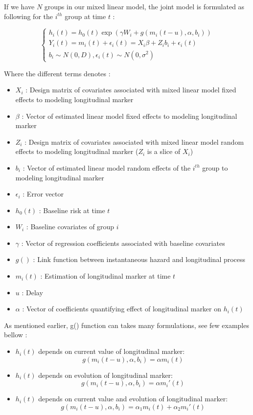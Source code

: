 \documentclass[11pt, oneside]{article}   	%
\providecommand{\tightlist}{%
      \setlength{\itemsep}{0pt}\setlength{\parskip}{0pt}}
\begin{document}
If we have \(N\) groups in our mixed linear model, the joint model is formulated as following for the \(i^{th}\) group at time  \(t\) :
 
 \[
  \left\{
    \begin{array}{l}
      h_i(t) = h_0(t) \exp(\gamma W_i + g(m_i(t-u), \alpha, b_i))\\
      Y_i(t) = m_i(t) + \epsilon_i(t) = X_i \beta + Z_i b_i + \epsilon_i(t) \\
       b_i \sim N(0,D), \epsilon_i(t) \sim N(0,\sigma^2)
    \end{array}
  \right.
\]
 
Where the different terms denotes :
 
\begin{itemize}
\tightlist
\item
  \(X_i\) : Design matrix of covariates associated with mixed linear model fixed
  effects to modeling longitudinal marker
\item
  \(\beta\) : Vector of estimated linear model fixed effects to
  modeling longitudinal marker
\item
  \(Z_i\) : Design matrix of covariates associated with mixed linear model random
  effects to modeling longitudinal marker (\(Z_i\) is a slice of  \(X_i\))
 \item
  \(b_i\) : Vector of estimated linear model random effects of the \(i^{th}\) group to 
  modeling longitudinal marker
\item
  \(\epsilon_i\) : Error vector
\item
  \(h_0(t)\) : Baseline risk at time \(t\)
\item
  \(W_i\) : Baseline covariates of group \(i\)
\item
  \(\gamma\) : Vector of regression coefficients associated with baseline covariates
\item
  \(g()\) : Link function between instantaneous hazard and longitudinal process
\item
  \(m_i(t)\) : Estimation of longitudinal marker at time \(t\)
\item
  \(u\) : Delay
\item
  \(\alpha\) : Vector of coefficients quantifying effect of longitudinal marker on \(h_i(t)\)    
\end{itemize}

As mentioned earlier, g() function can takes many formulations, see few examples bellow :
\begin{itemize}
\tightlist
\item
  \(h_i(t)\) depends on current value of longitudinal marker:
    \[
       g(m_i(t-u), \alpha, b_i) = \alpha m_i(t)
   \]
\item
  \(h_i(t)\) depends on evolution of longitudinal marker:
    \[
       g(m_i(t-u), \alpha, b_i) =  \alpha m_i'(t)
   \]
\item
  \(h_i(t)\) depends on current value and evolution of longitudinal marker:
    \[
       g(m_i(t-u), \alpha, b_i) = \alpha_1 m_i(t) + \alpha_2 m_i'(t)
   \]
\end{itemize}
\end{document}
